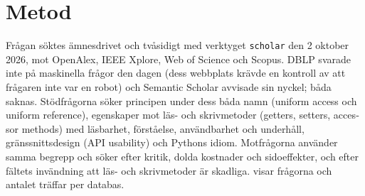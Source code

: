 \section{Metod}
\label{sec:egen-metod}

Frågan söktes ämnesdrivet och tvåsidigt med verktyget \texttt{scholar}
den 2 oktober 2026, mot OpenAlex, IEEE Xplore, Web of Science och Scopus.
DBLP svarade inte på maskinella frågor den dagen (dess webbplats krävde
en kontroll av att frågaren inte var en robot) och Semantic Scholar
avvisade sin nyckel; båda saknas.  Stödfrågorna söker principen under
dess båda namn (\foreignlanguage{english}{uniform access} och
\foreignlanguage{english}{uniform reference}), egenskaper mot läs- och
skrivmetoder (\foreignlanguage{english}{getters}, \foreignlanguage{english}{setters},
\foreignlanguage{english}{accessor methods}) med läsbarhet, förståelse,
användbarhet och underhåll, gränssnittsdesign
(\foreignlanguage{english}{API usability}) och Pythons idiom.
Motfrågorna använder samma begrepp och söker efter kritik, dolda
kostnader och sidoeffekter, och efter fältets invändning att läs- och
skrivmetoder är skadliga.   visar frågorna och
antalet träffar per databas.

